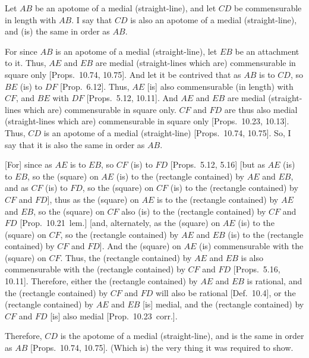\begin{Parallel}{}{}
{Let $AB$ be an apotome of a medial (straight-line), and let $CD$
be commensurable in length with $AB$. I say that $CD$ is also an
apotome of a medial (straight-line), and (is) the same in order as $AB$.

For since $AB$ is an apotome of a medial (straight-line), let $EB$ be
an attachment to it. Thus, $AE$ and $EB$ are medial (straight-lines which are) commensurable in square only [Props.~10.74, 10.75]. And let it be contrived that as
$AB$ is to $CD$, so $BE$ (is) to $DF$ [Prop.~6.12]. 
Thus, $AE$ [is] also commensurable (in length) with $CF$, and $BE$
with $DF$ [Props.~5.12, 10.11]. And $AE$ and $EB$ are medial (straight-lines which are) commensurable in square only. $CF$ and $FD$
are thus also medial (straight-lines which are) commensurable in square only
[Props.~10.23, 10.13]. 
Thus, $CD$ is an apotome of a medial (straight-line) [Props.~10.74, 10.75].
So, I say that it is also the same in order as $AB$.

\mbox{[}For] since as $AE$ is to $EB$, so $CF$ (is) to $FD$ [Props.~5.12, 5.16] [but
as $AE$ (is) to $EB$, so the (square) on $AE$ (is) to the (rectangle
contained) by $AE$ and $EB$, and as $CF$ (is) to $FD$, so the
(square) on $CF$ (is) to the (rectangle contained) by $CF$ and $FD$],
thus as  the (square) on $AE$ is to the (rectangle contained) by $AE$
and $EB$, so the (square) on $CF$ also (is) to the (rectangle contained)
by $CF$ and $FD$ [Prop.~10.21~lem.] [and,
alternately, as the (square) on $AE$ (is) to the (square) on $CF$, so
the (rectangle contained) by $AE$ and $EB$ (is) to the (rectangle contained)
by $CF$ and $FD$]. And the (square) on $AE$ (is) commensurable
with the (square) on $CF$. Thus, the (rectangle contained) by $AE$ and
$EB$ is also commensurable with the (rectangle contained) by $CF$ and
$FD$ [Props.~5.16, 10.11].
Therefore, either the (rectangle contained) by $AE$ and $EB$ is rational, and
the (rectangle contained) by $CF$ and $FD$ will also be rational [Def.~10.4], or
the (rectangle contained) by $AE$ and $EB$ [is] medial, and the
(rectangle contained) by $CF$ and $FD$ [is] also medial [Prop.~10.23~corr.].

Therefore, $CD$ is the apotome of a medial (straight-line), and is
the same in order as $AB$ [Props.~10.74, 10.75]. (Which is) the very thing it was required to show.}
\end{Parallel}

